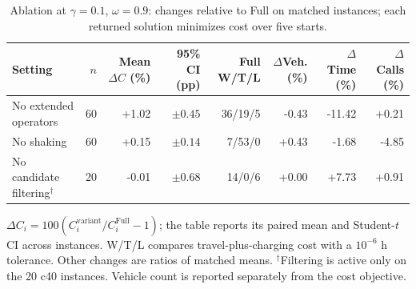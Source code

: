 \begin{table}[!t]
\centering
\footnotesize
\caption{Ablation at $\gamma=0.1$, $\omega=0.9$: changes relative to Full on matched instances; each returned solution minimizes cost over five starts.}
\label{tab:ablation_results}
\setlength{\tabcolsep}{3pt}
\renewcommand{\arraystretch}{1.12}
\begin{tabular}{lrrrrrrr}
\toprule
Setting & $n$ & Mean $\Delta C$ (\%) & 95\% CI (pp) & Full W/T/L & $\Delta$Veh. (\%) & $\Delta$Time (\%) & $\Delta$Calls (\%) \\
\midrule
No extended operators & 60 & +1.02 & $\pm 0.45$ & 36/19/5 & -0.43 & -11.42 & +0.21 \\
No shaking & 60 & +0.15 & $\pm 0.14$ & 7/53/0 & +0.43 & -1.68 & -4.85 \\
No candidate filtering$^{\dagger}$ & 20 & -0.01 & $\pm 0.68$ & 14/0/6 & +0.00 & +7.73 & +0.91 \\
\bottomrule
\end{tabular}

\par\vspace{2pt}\begin{minipage}{\textwidth}\scriptsize $\Delta C_i=100(C_i^{\mathrm{variant}}/C_i^{\mathrm{Full}}-1)$; the table reports its paired mean and Student-$t$ CI across instances. W/T/L compares travel-plus-charging cost with a $10^{-6}$ h tolerance. Other changes are ratios of matched means. $^{\dagger}$Filtering is active only on the 20 c40 instances. Vehicle count is reported separately from the cost objective.\end{minipage}
\end{table}
